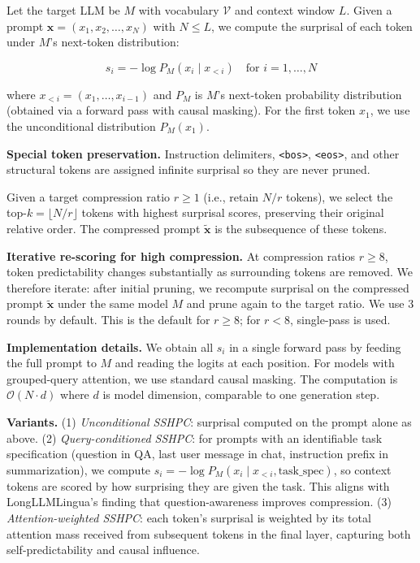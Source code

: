 \documentclass[11pt,letterpaper]{article}
\begin{document}
Let the target LLM be $M$ with vocabulary $\mathcal{V}$ and context window $L$. Given a prompt $\mathbf{x} = (x_1, x_2, \dots, x_N)$ with $N \le L$, we compute the surprisal of each token under $M$'s next-token distribution:

\begin{equation}
s_i = -\log P_M(x_i \mid x_{<i}) \quad \text{for } i = 1, \dots, N
\end{equation}

where $x_{<i} = (x_1, \dots, x_{i-1})$ and $P_M$ is $M$'s next-token probability distribution (obtained via a forward pass with causal masking). For the first token $x_1$, we use the unconditional distribution $P_M(x_1)$.

\textbf{Special token preservation.} Instruction delimiters, \texttt{<bos>}, \texttt{<eos>}, and other structural tokens are assigned infinite surprisal so they are never pruned.

Given a target compression ratio $r \ge 1$ (i.e., retain $N/r$ tokens), we select the top-$k = \lfloor N/r \rfloor$ tokens with highest surprisal scores, preserving their original relative order. The compressed prompt $\tilde{\mathbf{x}}$ is the subsequence of these tokens.

\textbf{Iterative re-scoring for high compression.} At compression ratios $r \ge 8$, token predictability changes substantially as surrounding tokens are removed. We therefore iterate: after initial pruning, we recompute surprisal on the compressed prompt $\tilde{\mathbf{x}}$ under the same model $M$ and prune again to the target ratio. We use 3 rounds by default. This is the default for $r \ge 8$; for $r < 8$, single-pass is used.

\textbf{Implementation details.} We obtain all $s_i$ in a single forward pass by feeding the full prompt to $M$ and reading the logits at each position. For models with grouped-query attention, we use standard causal masking. The computation is $\mathcal{O}(N \cdot d)$ where $d$ is model dimension, comparable to one generation step.

\textbf{Variants.} (1) \textit{Unconditional SSHPC}: surprisal computed on the prompt alone as above. (2) \textit{Query-conditioned SSHPC}: for prompts with an identifiable task specification (question in QA, last user message in chat, instruction prefix in summarization), we compute $s_i = -\log P_M(x_i \mid x_{<i}, \text{task\_spec})$, so context tokens are scored by how surprising they are given the task. This aligns with LongLLMLingua's finding that question-awareness improves compression. (3) \textit{Attention-weighted SSHPC}: each token's surprisal is weighted by its total attention mass received from subsequent tokens in the final layer, capturing both self-predictability and causal influence.
\end{document}
